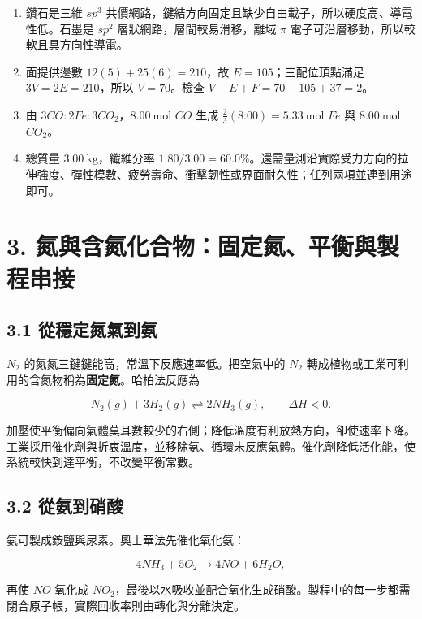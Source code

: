 \documentclass[11pt,a4paper]{article}
\providecommand{\tightlist}{%
  \setlength{\itemsep}{0pt}\setlength{\parskip}{0pt}}
\begin{document}
\begin{enumerate}
\def\labelenumi{\arabic{enumi}.}
\tightlist
\item
  鑽石是三維 \(sp^3\) 共價網路，鍵結方向固定且缺少自由載子，所以硬度高、導電性低。石墨是 \(sp^2\) 層狀網路，層間較易滑移，離域 \(\pi\) 電子可沿層移動，所以較軟且具方向性導電。
\item
  面提供邊數 \(12(5)+25(6)=210\)，故 \(E=105\)；三配位頂點滿足 \(3V=2E=210\)，所以 \(V=70\)。檢查 \(V-E+F=70-105+37=2\)。
\item
  由 \(3CO:2Fe:3CO_2\)，\(8.00\ \mathrm{mol}\) \(CO\) 生成 \(\frac23(8.00)=5.33\ \mathrm{mol}\) \(Fe\) 與 \(8.00\ \mathrm{mol}\) \(CO_2\)。
\item
  總質量 \(3.00\ \mathrm{kg}\)，纖維分率 \(1.80/3.00=60.0\%\)。還需量測沿實際受力方向的拉伸強度、彈性模數、疲勞壽命、衝擊韌性或界面耐久性；任列兩項並連到用途即可。
\end{enumerate}

\section{3. 氮與含氮化合物：固定氮、平衡與製程串接}\label{ux6c2eux8207ux542bux6c2eux5316ux5408ux7269ux56faux5b9aux6c2eux5e73ux8861ux8207ux88fdux7a0bux4e32ux63a5}

\subsection{3.1 從穩定氮氣到氨}\label{ux5f9eux7a69ux5b9aux6c2eux6c23ux5230ux6c28}

\(N_2\) 的氮氮三鍵鍵能高，常溫下反應速率低。把空氣中的 \(N_2\) 轉成植物或工業可利用的含氮物稱為\textbf{固定氮}。哈柏法反應為

\[
N_2(g)+3H_2(g)\rightleftharpoons2NH_3(g),\qquad \Delta H<0.
\]

加壓使平衡偏向氣體莫耳數較少的右側；降低溫度有利放熱方向，卻使速率下降。工業採用催化劑與折衷溫度，並移除氨、循環未反應氣體。催化劑降低活化能，使系統較快到達平衡，不改變平衡常數。

\subsection{3.2 從氨到硝酸}\label{ux5f9eux6c28ux5230ux785dux9178}

氨可製成銨鹽與尿素。奧士華法先催化氧化氨：

\[
4NH_3+5O_2\rightarrow4NO+6H_2O,
\]

再使 \(NO\) 氧化成 \(NO_2\)，最後以水吸收並配合氧化生成硝酸。製程中的每一步都需閉合原子帳，實際回收率則由轉化與分離決定。
\end{document}
